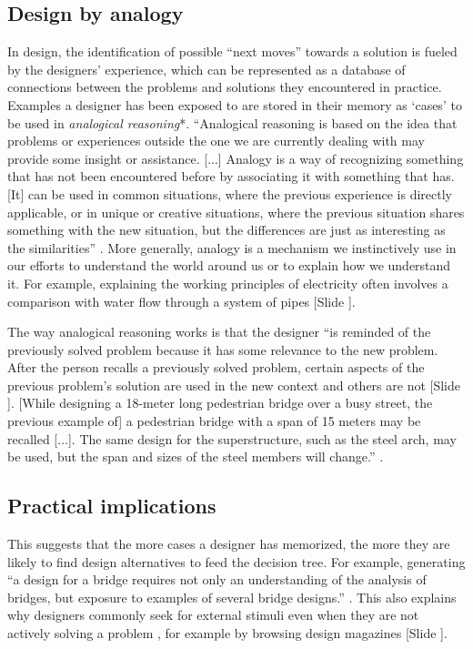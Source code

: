 \documentclass{article}
\newcounter{slide}
\begin{document}
\subsection{Design by analogy}
\label{sec:cbr}
In design, the identification of possible ``next moves'' towards a solution is fueled by the designers' experience, which can be represented as a database of connections between the problems and solutions they encountered in practice. Examples a designer has been exposed to are stored in their memory as `cases' to be used in \emph{analogical reasoning}*. ``Analogical reasoning is based on the idea that problems or experiences outside the one we are currently dealing with may provide some insight or assistance. [...] Analogy is a way of recognizing something that has not been encountered before by associating it with something that has. [It] can be used in common situations, where the previous experience is directly applicable, or in unique or creative situations, where the previous situation shares something with the new situation, but the differences are just as interesting as the similarities'' \cite[p. 1]{maher2014case}. More generally, analogy is a mechanism we instinctively use in our efforts to understand the world around us or to explain how we understand it. For example, explaining the working principles of electricity often involves a comparison with water flow through a system of pipes {\color{blue}[Slide ]}. 

The way analogical reasoning works is that the designer ``is reminded of the previously solved problem because it has some relevance to the new problem. After the person recalls a previously solved problem, certain aspects of the previous problem's solution are used in the new context and others are not {\color{blue}[Slide ]}. [While designing a 18-meter long pedestrian bridge over a busy street, the previous example of] a pedestrian bridge with a span of 15 meters may be recalled [...]. The same design for the superstructure, such as the steel arch, may be used, but the span and sizes of the steel members will change.'' \cite[p. 1-4]{maher2014case}.

\subsection{Practical implications}
\label{sec:heuristics}
This suggests that the more cases a designer has memorized, the more they are likely to find design alternatives to feed the decision tree. For example, generating ``a design for a bridge requires not only an understanding of the analysis of bridges, but exposure to examples of several bridge designs.'' \cite[p. 1]{maher2014case}. This also explains why designers commonly seek for external stimuli even when they are not actively solving a problem \cite{goncalvesInspirationChoicesThat2016}, for example by browsing design magazines {\color{blue}[Slide ]}.
\end{document}
